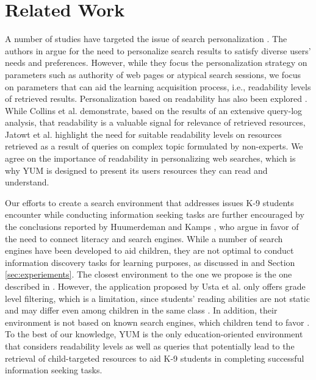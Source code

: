 \documentclass{sig-alternate-05-2015}
\begin{document}
\section{Related Work}
A number of studies have targeted the issue of search personalization \cite{Col11, Eic13, Jat12, Wan13}. The authors in \cite{Eic13, Wan13} argue for the need to personalize search results to satisfy diverse users' needs and preferences. However, while they  focus the personalization strategy on parameters such as authority of web pages or atypical search sessions, we focus on parameters that can aid the learning acquisition process, i.e., readability levels of retrieved results. Personalization based on readability has also been explored \cite{Col11, Jat12}. While Collins et al. \cite{Col11} demonstrate, based on the results of an extensive query-log analysis, that readability is a valuable signal for relevance of retrieved resources, Jatowt et al. \cite{Jat12} highlight the need for suitable readability levels on resources retrieved as a result of queries on complex topic formulated by non-experts. We agree on the importance of readability in personalizing web searches, which is why YUM is designed to present its users resources they can read and understand.

 Our efforts to create a search environment that addresses issues K-9 students encounter while conducting information seeking tasks are further encouraged by the conclusions reported by Huumerdeman and Kamps \cite{Huu15}, who argue in favor of the need to connect literacy and search engines. While a number of search engines have been developed to aid children, they are not optimal to conduct information discovery tasks for learning purposes, as discussed in \cite{Gos13} and Section \ref{sec:experiements}. The closest environment to the one we propose is the one described in \cite{Ust14}. However, the application proposed by Usta et al. \cite{Ust14} only offers grade level filtering, which is a limitation, since students' reading abilities are not static and may differ even among children in the same class \cite{sh13}. In addition, their environment is not based on known search engines, which children tend to favor \cite{Bil13}.  To the best of our knowledge, YUM is the only education-oriented environment that considers readability levels as well as queries that potentially lead to the retrieval of child-targeted resources to aid K-9 students in completing successful information seeking tasks.
\end{document}
